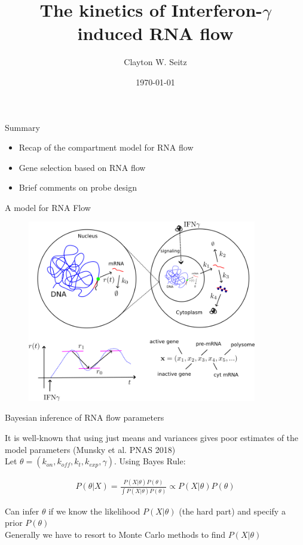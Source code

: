 \documentclass[aspectratio=1610]{beamer}					%
\title{The kinetics of Interferon-$\gamma$ induced RNA flow}	%
\author{Clayton W. Seitz}								%
\date{\today}									%
\begin{document}
\begin{frame}
  \titlepage
\end{frame}


%

\begin{frame}{Summary}
\begin{itemize}
\item Recap of the compartment model for RNA flow
\item Gene selection based on RNA flow
\item Brief comments on probe design
\end{itemize}
\end{frame}

\begin{frame}{A model for RNA Flow}
\begin{figure}
\includegraphics[width=10cm]{RNAFlow.png}
\end{figure}
\end{frame}



\begin{frame}{Bayesian inference of RNA flow parameters}

It is well-known that using just means and variances gives poor estimates of the model parameters (Munsky et al. PNAS 2018)\\
\vspace{0.2in}
Let $\theta = \left( k_{on},k_{off},k_{t},k_{exp},\gamma\right)$. Using Bayes Rule: 

\begin{align*}
P(\theta|X) = \frac{P(X|\theta)P(\theta)}{\int P(X|\theta)P(\theta)} \propto P(X|\theta)P(\theta)
\end{align*}

Can infer $\theta$ if we know the likelihood $P(X|\theta)$ (the hard part) and specify a prior $P(\theta)$\\
\vspace{0.2in}
Generally we have to resort to Monte Carlo methods to find $P(X|\theta)$

\end{frame}
\end{document}
